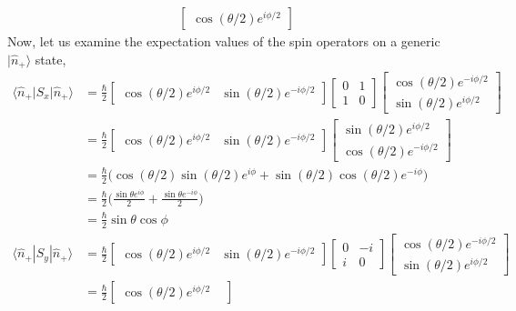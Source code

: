 \documentclass[../principles-of-quantum-mechanics.tex]{subfiles}
\begin{document}
\begin{questions}
\begin{solution}
\begin{align*}
\begin{bmatrix}
					\cos(\theta/2)e^{i\phi/2}
				\end{bmatrix}
			\end{align*}
			Now, let us examine the expectation values of the spin operators on a generic $|\hat{n}_+\rangle$ state,
			\begin{align*}
				\langle \hat{n}_+|S_x|\hat{n}_+\rangle &= \frac{\hbar}{2}\begin{bmatrix}
					\cos(\theta/2)e^{i\phi/2} &
					\sin(\theta/2)e^{-i\phi/2}
				\end{bmatrix}\begin{bmatrix}
					0 & 1 \\ 1 & 0
				\end{bmatrix}\begin{bmatrix}
					\cos(\theta/2)e^{-i\phi/2} \\
					\sin(\theta/2)e^{i\phi/2}
				\end{bmatrix} \\
				&= \frac{\hbar}{2}\begin{bmatrix}
					\cos(\theta/2)e^{i\phi/2} &
					\sin(\theta/2)e^{-i\phi/2}
				\end{bmatrix}\begin{bmatrix}
					\sin(\theta/2)e^{i\phi/2} \\
					\cos(\theta/2)e^{-i\phi/2}
				\end{bmatrix} \\
				&= \frac{\hbar}{2}\Big(\cos(\theta/2)\sin(\theta/2)e^{i\phi} + \sin(\theta/2)\cos(\theta/2)e^{-i\phi}\Big) \\
				&= \frac{\hbar}{2}\Big(\frac{\sin\theta e^{i\phi}}{2} + \frac{\sin\theta e^{-i\phi}}{2}\Big) \\
				&= \frac{\hbar}{2}\sin\theta\cos\phi \\
				\langle \hat{n}_+ | S_y | \hat{n}_+\rangle &= \frac{\hbar}{2}\begin{bmatrix}
					\cos(\theta/2)e^{i\phi/2} &
					\sin(\theta/2)e^{-i\phi/2}
				\end{bmatrix}\begin{bmatrix}
					0 & -i \\ i & 0
				\end{bmatrix}\begin{bmatrix}
					\cos(\theta/2)e^{-i\phi/2} \\
					\sin(\theta/2)e^{i\phi/2}
				\end{bmatrix} \\
				&= \frac{\hbar}{2}\begin{bmatrix}
					\cos(\theta/2)e^{i\phi/2} &

\end{bmatrix}
\end{align*}
\end{solution}
\end{questions}
\end{document}
